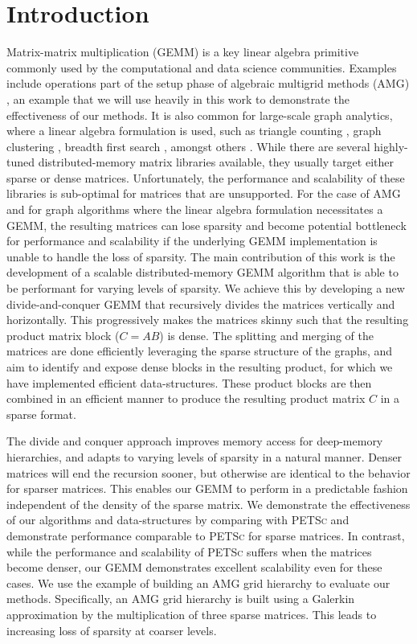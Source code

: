 \section{Introduction}
\label{sec:intro}


Matrix-matrix multiplication (\textsc{GEMM}) is a key linear algebra primitive commonly used by the computational and data science communities. Examples include operations part of the setup phase of algebraic multigrid methods (AMG) \cite{Dendy82}, an example that we will use heavily in this work to demonstrate the effectiveness of our methods. It is also common for large-scale graph analytics, where a linear algebra formulation is used, such as triangle counting \cite{azad2015parallel}, graph clustering \cite{van2000graph}, breadth first search \cite{gilbert2008unified}, amongst others \cite{kepner2011graph}. 
While there are several highly-tuned distributed-memory matrix libraries available, they usually target either sparse \cite{petsc, combblas} or dense \cite{elemental} matrices. Unfortunately, the performance and scalability of these libraries is sub-optimal for matrices that are unsupported. For the case of AMG and for graph algorithms where the linear algebra formulation necessitates a \textsc{GEMM}, the resulting matrices can lose sparsity and become potential bottleneck for performance and scalability if the underlying \textsc{GEMM} implementation is unable to handle the loss of sparsity. The main contribution of this work is the development of a scalable distributed-memory \textsc{GEMM} algorithm that is able to be performant for varying levels of sparsity. 
We achieve this by developing a new divide-and-conquer \textsc{GEMM} that recursively divides the matrices vertically and horizontally. This progressively makes the matrices skinny such that the resulting product matrix block ($C = AB$) is dense. The splitting and merging of the matrices are done efficiently leveraging the sparse structure of the graphs, and aim to identify and expose dense blocks in the resulting product, for which we have implemented efficient data-structures. These product blocks are then combined in an efficient manner to produce the resulting product matrix $C$ in a sparse format. 

The divide and conquer approach improves memory access for deep-memory hierarchies, and adapts to varying levels of sparsity in a natural manner. Denser matrices will end the recursion sooner, but otherwise are identical to the behavior for sparser matrices. This enables our \textsc{GEMM} to perform in a predictable fashion independent of the density of the sparse matrix. We demonstrate the effectiveness of our algorithms and data-structures by comparing with \textsc{PETSc} \cite{petsc} and demonstrate performance comparable to \textsc{PETSc} for sparse matrices. In contrast, while the performance and scalability of \textsc{PETSc} suffers when the matrices become denser, our \textsc{GEMM} demonstrates excellent scalability even for these cases. We use the example of building an AMG grid hierarchy to evaluate our methods. Specifically, an AMG grid hierarchy is built using a Galerkin approximation by the multiplication of three sparse matrices. This leads to increasing loss of sparsity at coarser levels. 


